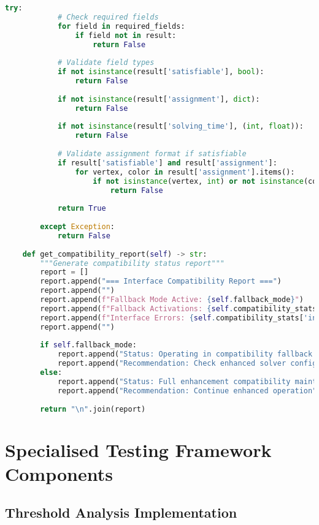 \begin{lstlisting}[language=Python, caption=Interface Compatibility with Existing Solver Infrastructure]
        try:
            # Check required fields
            for field in required_fields:
                if field not in result:
                    return False
            
            # Validate field types
            if not isinstance(result['satisfiable'], bool):
                return False
            
            if not isinstance(result['assignment'], dict):
                return False
            
            if not isinstance(result['solving_time'], (int, float)):
                return False
            
            # Validate assignment format if satisfiable
            if result['satisfiable'] and result['assignment']:
                for vertex, color in result['assignment'].items():
                    if not isinstance(vertex, int) or not isinstance(color, int):
                        return False
            
            return True
            
        except Exception:
            return False
    
    def get_compatibility_report(self) -> str:
        """Generate compatibility status report"""
        report = []
        report.append("=== Interface Compatibility Report ===")
        report.append("")
        report.append(f"Fallback Mode Active: {self.fallback_mode}")
        report.append(f"Fallback Activations: {self.compatibility_stats['fallback_activations']}")
        report.append(f"Interface Errors: {self.compatibility_stats['interface_errors']}")
        report.append("")
        
        if self.fallback_mode:
            report.append("Status: Operating in compatibility fallback mode")
            report.append("Recommendation: Check enhanced solver configuration")
        else:
            report.append("Status: Full enhancement compatibility maintained")
            report.append("Recommendation: Continue enhanced operation")
        
        return "\n".join(report)
\end{lstlisting}

\section{Specialised Testing Framework Components}
\label{appendix:testing-framework}

\subsection{Threshold Analysis Implementation}
\label{appendix:threshold-analysis}

